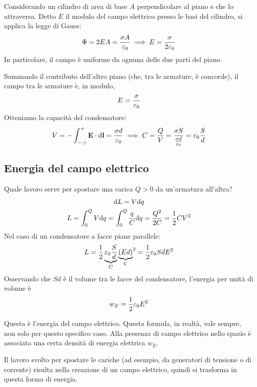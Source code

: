 Considerando un cilindro di area di base $A$ perpendicolare al piano e che lo attraversa.
Detto $E$ il modulo del campo elettrico presso le basi del cilindro, si applica la legge di Gauss:
\begin{equation}
    \Phi = 2 E A = \frac{\sigma A}{\varepsilon_0} \implies E = \frac{\sigma}{2 \varepsilon_0}
\end{equation}
In particolare, il campo è uniforme da ognuna delle due parti del piano.

Sommando il contributo dell'altro piano (che, tra le armature, è concorde), il campo tra le armature è, in modulo,
\begin{equation}
    E = \frac{\sigma}{\varepsilon_0}
\end{equation}
Otteniamo la capacità del condensatore:
\begin{equation}
    V = - \int_{-,\gamma}^+ \mathbf{E} \cdot \mathrm{d} \mathbf{l} = \frac{\sigma d}{\varepsilon_0} \implies
    C = \frac{Q}{V} = \frac{\sigma S}{\frac{\sigma d}{\varepsilon_0}} = \varepsilon_0 \frac{S}{d}
\end{equation}

\subsection{Energia del campo elettrico}

Quale lavoro serve per spostare una carica $Q > 0$ da un'armatura all'altra?
\begin{gather}
    \mathrm{d} L = V \mathrm{d} q \\
    L = \int_0^Q V \mathrm{d} q = \int_0^Q \frac{q}{C} \mathrm{d} q = \frac{Q^2}{2 C} = \frac{1}{2} C V^2
\end{gather}
Nel caso di un condensatore a facce piane parallele:
\begin{equation}
    L = \frac{1}{2} \underbrace{\varepsilon_0 \frac{S}{d}}_C {\underbrace{(E d)}_V}^2 = \frac{1}{2} \varepsilon_0 S d E^2
\end{equation}
Osservando che $S d$ è il volume tra le facce del condensatore, l'energia per unità di volume è
\begin{equation}
    w_E = \frac{1}{2} \varepsilon_0 E^2
\end{equation}

Questa è l'energia del campo elettrico.
Questa formula, in realtà, vale sempre, non solo per questo specifico caso.
Alla presenza di campo elettrico nello spazio è associata una certa densità di energia elettrica $w_E$.

Il lavoro svolto per spostare le cariche (ad esempio, da generatori di tensione o di corrente) risulta nella creazione di un campo elettrico, quindi si trasforma in questa forma di energia.

